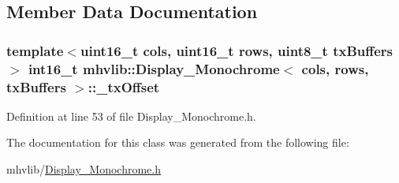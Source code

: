 \subsection{Member Data Documentation}
\hypertarget{classmhvlib_1_1_display___monochrome_ae65ec5b39bb3d4f85c9eff257b06704e}{
\subsubsection[{\-\_\-tx\-Offset}]{\setlength{\rightskip}{0pt plus 5cm}template$<$uint16\-\_\-t cols, uint16\-\_\-t rows, uint8\-\_\-t tx\-Buffers$>$ int16\-\_\-t {\bf mhvlib\-::\-Display\-\_\-\-Monochrome}$<$ cols, rows, tx\-Buffers $>$\-::\-\_\-tx\-Offset\hspace{0.3cm}{\ttfamily [protected]}}}\label{classmhvlib_1_1_display___monochrome_ae65ec5b39bb3d4f85c9eff257b06704e}


Definition at line 53 of file Display\-\_\-\-Monochrome.\-h.



The documentation for this class was generated from the following file\-:\begin{DoxyCompactItemize}
\item 
mhvlib/\hyperlink{_display___monochrome_8h}{Display\-\_\-\-Monochrome.\-h}\end{DoxyCompactItemize}
